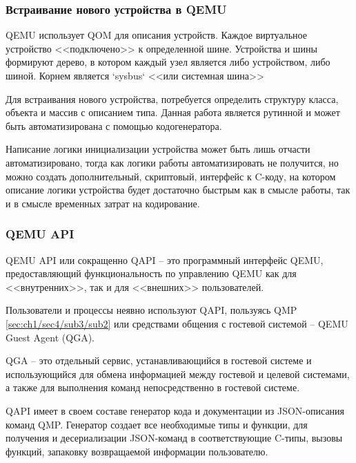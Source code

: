 \subsubsection{Встраивание нового устройства в QEMU}\label{sec:ch1/sec4/sub3/sub4}

QEMU использует QOM для описания устройств. Каждое виртуальное устройство <<подключено>> к определенной
шине. Устройства и шины формируют дерево, в котором каждый узел является либо устройством, либо
шиной. Корнем является `sysbus` <<или системная шина>>

Для встраивания нового устройства, потребуется определить структуру класса, объекта и массив с описанием
типа. Данная работа является рутинной и может быть автоматизирована с помощью кодогенератора.

Написание логики инициализации устройства может быть лишь отчасти автоматизировано, тогда как
логики работы автоматизировать не получится, но можно создать дополнительный, скриптовый,
интерфейс к C-коду, на котором описание логики устройства будет достаточно быстрым как
в смысле работы, так и в смысле временных затрат на кодирование.


\subsubsection{QEMU API}\label{sec:ch1/sec4/sub3/sub5}

QEMU API или сокращенно QAPI -- это программный интерфейс QEMU, предоставляющий функциональность по
управлению QEMU как для <<внутренних>>, так и для <<внешних>> пользователей.

Пользователи и процессы неявно используют QAPI, пользуясь QMP \ref{sec:ch1/sec4/sub3/sub2} или средствами
общения с гостевой системой -- QEMU Guest Agent (QGA).

QGA -- это отдельный сервис, устанавливающийся в гостевой системе и использующийся для обмена информацией
между гостевой и целевой системами, а также для выполнения команд непосредственно в гостевой системе.

QAPI имеет в своем составе генератор кода и документации из JSON-описания команд QMP.
Генератор создает все необходимые типы и функции, для получения и десериализации JSON-команд в соответствующие
C-типы, вызовы функций, запаковку возвращаемой информации пользователю.

